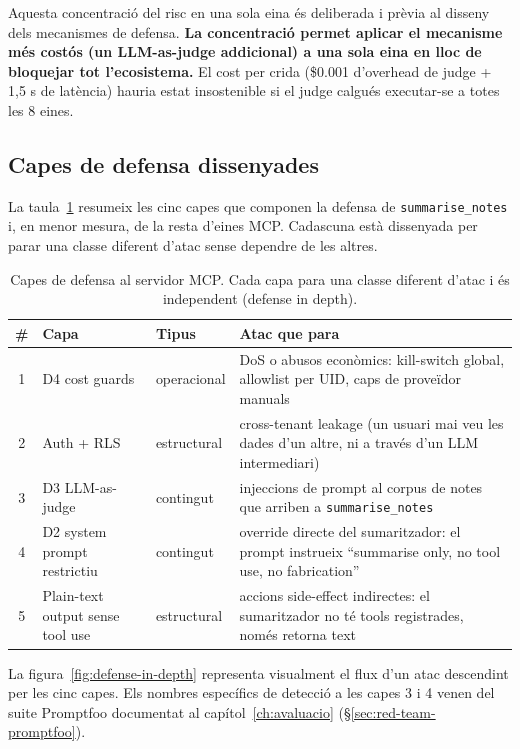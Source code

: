 Aquesta concentració del risc en una sola eina és deliberada i prèvia al disseny dels mecanismes de defensa. \textbf{La concentració permet aplicar el mecanisme més costós (un LLM-as-judge addicional) a una sola eina en lloc de bloquejar tot l'ecosistema.} El cost per crida (\$0.001 d'overhead de judge + 1,5 s de latència) hauria estat insostenible si el judge calgués executar-se a totes les 8 eines.

\subsection{Capes de defensa dissenyades}
\label{sec:defense-layers}

La taula~\ref{tab:defense-layers} resumeix les cinc capes que componen la defensa de \texttt{summarise\_notes} i, en menor mesura, de la resta d'eines MCP. Cadascuna està dissenyada per parar una classe diferent d'atac sense dependre de les altres.

\begin{table}[H]
    \centering
    \small
    \caption{Capes de defensa al servidor MCP. Cada capa para una classe diferent d'atac i és independent (defense in depth).}
    \label{tab:defense-layers}
    \begin{tabular}{@{}c>{\raggedright\arraybackslash}p{3.6cm}l>{\raggedright\arraybackslash}p{6.5cm}@{}}
        \toprule
        \# & Capa & Tipus & Atac que para \\
        \midrule
        1 & D4 cost guards & operacional & DoS o abusos econòmics: kill-switch global, allowlist per UID, caps de proveïdor manuals \\
        2 & Auth + RLS & estructural & cross-tenant leakage (un usuari mai veu les dades d'un altre, ni a través d'un LLM intermediari) \\
        3 & D3 LLM-as-judge & contingut & injeccions de prompt al corpus de notes que arriben a \texttt{summarise\_notes} \\
        4 & D2 system prompt restrictiu & contingut & override directe del sumaritzador: el prompt instrueix ``summarise only, no tool use, no fabrication'' \\
        5 & Plain-text output sense tool use & estructural & accions side-effect indirectes: el sumaritzador no té tools registrades, només retorna text \\
        \bottomrule
    \end{tabular}
\end{table}

La figura~\ref{fig:defense-in-depth} representa visualment el flux d'un atac descendint per les cinc capes. Els nombres específics de detecció a les capes 3 i 4 venen del suite Promptfoo documentat al capítol~\ref{ch:avaluacio} (\S\ref{sec:red-team-promptfoo}).

